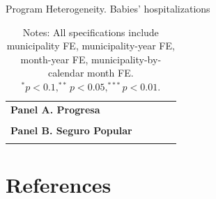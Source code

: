 \documentclass[12pt, oneside]{article}      %
\begin{document}
\clearpage
\newpage

\begin{table}[!ht]
\centering
\caption{Program Heterogeneity. Babies' hospitalizations}\label{tab:program_heterogeneity_babies}
\fontsize{10pt}{12pt}\selectfont
\begin{tabular}{lcccc}
\toprule
\textbf{Panel A. Progresa} & &   \\
 \\
\midrule
\textbf{Panel B. Seguro Popular} & &  \\
 \\
\bottomrule
\end{tabular}
\caption*{\footnotesize{Notes: All specifications include municipality FE, municipality-year FE, month-year FE, municipality-by-calendar month FE. $^* p<0.1, ^{**} p<0.05, ^{***} p<0.01$.}}
\end{table}



\newpage
\clearpage
 
\section*{References}
\nocite{*}
\begingroup
\singlespacing
\renewcommand{\section}[2]{}%
\begin{spacing}{2}

\end{spacing}
\endgroup
\clearpage



\appendix
\clearpage
\newpage
\section*{Appendix}
\setcounter{figure}{0} \renewcommand{\thefigure}{A.\arabic{figure}}
\setcounter{table}{0} \renewcommand{\thetable}{A.\arabic{table}}
\end{document}

